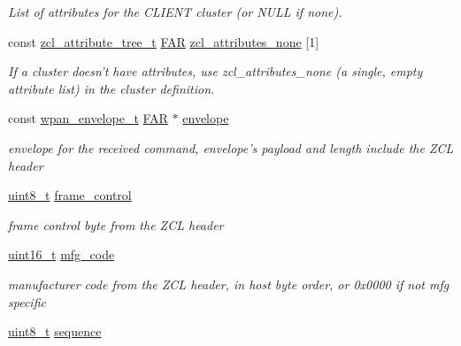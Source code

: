 \begin{DoxyCompactItemize}
\begin{DoxyCompactList}\small\item\em List of attributes for the C\-L\-I\-E\-N\-T cluster (or N\-U\-L\-L if none). \end{DoxyCompactList}\item 
const \hyperlink{structzcl__attribute__tree__t}{zcl\-\_\-attribute\-\_\-tree\-\_\-t} \hyperlink{group__hal_gaef060b3456fdcc093a7210a762d5f2ed}{F\-A\-R} \hyperlink{group__zcl_gad1e7f7dd501a7ab02f6004e4091c6bea}{zcl\-\_\-attributes\-\_\-none} \mbox{[}1\mbox{]}
\begin{DoxyCompactList}\small\item\em If a cluster doesn't have attributes, use zcl\-\_\-attributes\-\_\-none (a single, empty attribute list) in the cluster definition. \end{DoxyCompactList}\item 
\hypertarget{group__zcl_ga1c24c7848d60bc6aa335a8ba9fd14b7a}{const \hyperlink{structwpan__envelope__t}{wpan\-\_\-envelope\-\_\-t} \hyperlink{group__hal_gaef060b3456fdcc093a7210a762d5f2ed}{F\-A\-R} $\ast$ \hyperlink{group__zcl_ga1c24c7848d60bc6aa335a8ba9fd14b7a}{envelope}}\label{group__zcl_ga1c24c7848d60bc6aa335a8ba9fd14b7a}

\begin{DoxyCompactList}\small\item\em envelope for the received command, envelope's payload and length include the Z\-C\-L header \end{DoxyCompactList}\item 
\hypertarget{group__zcl_ga5226462a41663bc81a5d67c04f18868a}{\hyperlink{group__hal_gae1affc9ca37cfb624959c866a73f83c2}{uint8\-\_\-t} \hyperlink{group__zcl_ga5226462a41663bc81a5d67c04f18868a}{frame\-\_\-control}}\label{group__zcl_ga5226462a41663bc81a5d67c04f18868a}

\begin{DoxyCompactList}\small\item\em frame control byte from the Z\-C\-L header \end{DoxyCompactList}\item 
\hypertarget{group__zcl_ga011fb17c1112658806badaccba7a246d}{\hyperlink{group__hal_ga5a8b2dc9e45a9ee81a94ef304fb62505}{uint16\-\_\-t} \hyperlink{group__zcl_ga011fb17c1112658806badaccba7a246d}{mfg\-\_\-code}}\label{group__zcl_ga011fb17c1112658806badaccba7a246d}

\begin{DoxyCompactList}\small\item\em manufacturer code from the Z\-C\-L header, in host byte order, or 0x0000 if not mfg specific \end{DoxyCompactList}\item 
\hypertarget{group__zcl_gacb5c8866a58116314f6c8eda9dc3544c}{\hyperlink{group__hal_gae1affc9ca37cfb624959c866a73f83c2}{uint8\-\_\-t} \hyperlink{group__zcl_gacb5c8866a58116314f6c8eda9dc3544c}{sequence}}\label{group__zcl_gacb5c8866a58116314f6c8eda9dc3544c}


\end{DoxyCompactItemize}
